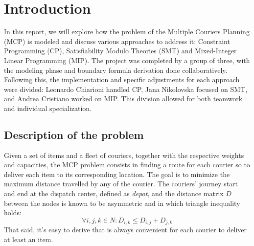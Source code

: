 \section{Introduction}


In this report, we will explore how the problem of the Multiple Couriers Planning (MCP) is modeled and discuss various approaches to address it: Constraint Programming (CP), Satisfiability Modulo Theories (SMT) and Mixed-Integer Linear Programming (MIP). The project was completed by a group of three, with the modeling phase and boundary formula derivation done collaboratively. Following this, the implementation and specific adjustments for each approach were divided: Leonardo Chiarioni handled CP, Jana Nikolovska focused on SMT, and Andrea Cristiano worked on MIP. This division allowed for both teamwork and individual specialization.

\subsection{Description of the problem}
Given a set of items and a fleet of couriers, together with the respective weights and capacities, the MCP problem consists in finding a route for each courier so to deliver each item to its corresponding location. The goal is to minimize the maximum distance travelled by any of the courier. The couriers' journey start and end at the dispatch center, defined as \textit{depot}, and the distance matrix $D$ between the nodes is known to be asymmetric and in which triangle inequality holds:
\begin{equation}
\label{eq:triangle}
    \forall i,j,k \in N: D_{i,k} \leq D_{i,j} + D_{j,k}
\end{equation}
That said, it's easy to derive that is always convenient for each courier to deliver at least an item. 

